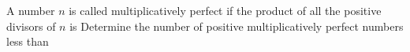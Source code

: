 A number $n$ is called multiplicatively perfect if the product of all the positive divisors of $n$ is  Determine the number of positive multiplicatively perfect numbers less than 